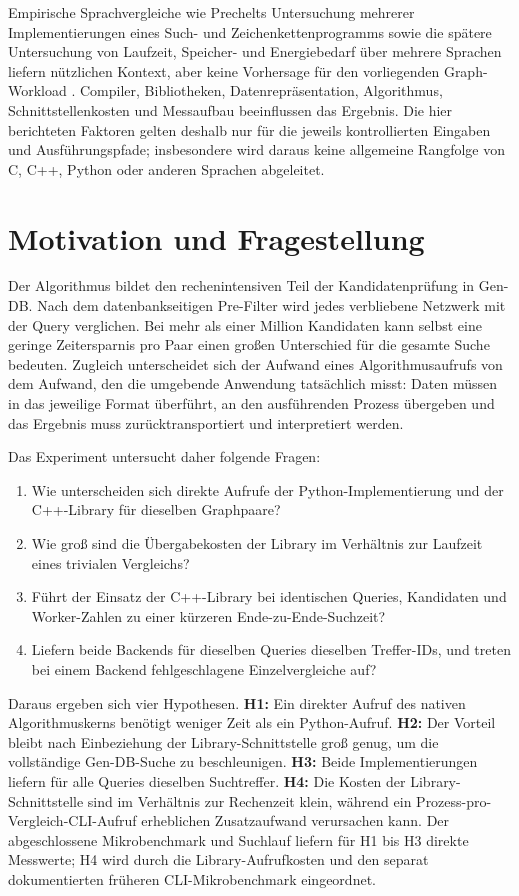 \documentclass[a4paper,12pt, twoside]{report}
\theoremstyle{definition}
\begin{document}
Empirische Sprachvergleiche wie Prechelts Untersuchung mehrerer Implementierungen eines Such- und Zeichenkettenprogramms sowie die spätere Untersuchung von Laufzeit, Speicher- und Energiebedarf über mehrere Sprachen liefern nützlichen Kontext, aber keine Vorhersage für den vorliegenden Graph-Workload \cite{prechelt2000sevenlanguages,pereira2017energy}. Compiler, Bibliotheken, Datenrepräsentation, Algorithmus, Schnittstellenkosten und Messaufbau beeinflussen das Ergebnis. Die hier berichteten Faktoren gelten deshalb nur für die jeweils kontrollierten Eingaben und Ausführungspfade; insbesondere wird daraus keine allgemeine Rangfolge von C, C++, Python oder anderen Sprachen abgeleitet.

\section{Motivation und Fragestellung}
\label{sec:backend_motivation}

Der Algorithmus bildet den rechenintensiven Teil der Kandidatenprüfung in Gen-DB. Nach dem datenbankseitigen Pre-Filter wird jedes verbliebene Netzwerk mit der Query verglichen. Bei mehr als einer Million Kandidaten kann selbst eine geringe Zeitersparnis pro Paar einen großen Unterschied für die gesamte Suche bedeuten. Zugleich unterscheidet sich der Aufwand eines Algorithmusaufrufs von dem Aufwand, den die umgebende Anwendung tatsächlich misst: Daten müssen in das jeweilige Format überführt, an den ausführenden Prozess übergeben und das Ergebnis muss zurücktransportiert und interpretiert werden.

Das Experiment untersucht daher folgende Fragen:

\begin{enumerate}
	\item Wie unterscheiden sich direkte Aufrufe der Python-Implementierung und der C++-Library für dieselben Graphpaare?
	\item Wie groß sind die Übergabekosten der Library im Verhältnis zur Laufzeit eines trivialen Vergleichs?
	\item Führt der Einsatz der C++-Library bei identischen Queries, Kandidaten und Worker-Zahlen zu einer kürzeren Ende-zu-Ende-Suchzeit?
	\item Liefern beide Backends für dieselben Queries dieselben Treffer-IDs, und treten bei einem Backend fehlgeschlagene Einzelvergleiche auf?
\end{enumerate}

Daraus ergeben sich vier Hypothesen. \textbf{H1:} Ein direkter Aufruf des nativen Algorithmuskerns benötigt weniger Zeit als ein Python-Aufruf. \textbf{H2:} Der Vorteil bleibt nach Einbeziehung der Library-Schnittstelle groß genug, um die vollständige Gen-DB-Suche zu beschleunigen. \textbf{H3:} Beide Implementierungen liefern für alle Queries dieselben Suchtreffer. \textbf{H4:} Die Kosten der Library-Schnittstelle sind im Verhältnis zur Rechenzeit klein, während ein Prozess-pro-Vergleich-CLI-Aufruf erheblichen Zusatzaufwand verursachen kann. Der abgeschlossene Mikrobenchmark und Suchlauf liefern für H1 bis H3 direkte Messwerte; H4 wird durch die Library-Aufrufkosten und den separat dokumentierten früheren CLI-Mikrobenchmark eingeordnet.
\end{document}
